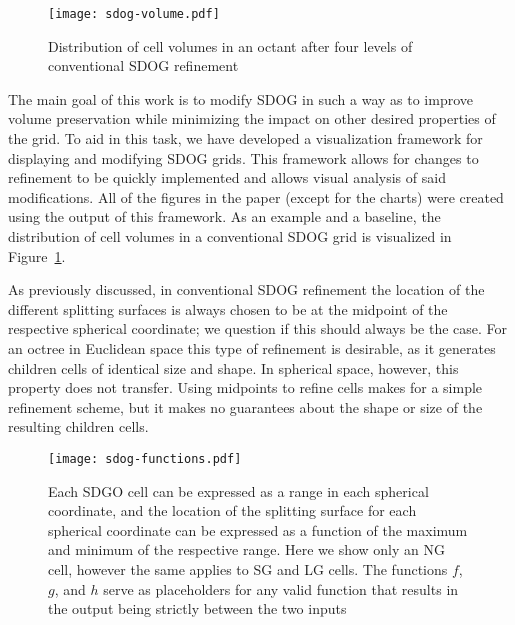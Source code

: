 \begin{figure}[tb]
	\texttt{[image: sdog-volume.pdf]}
	\caption[Title]{
		Distribution of cell volumes in an octant after four levels of conventional SDOG refinement
	}
	\label{fig:sdog-vol}
\end{figure}


The main goal of this work is to modify SDOG in such a way as to improve volume preservation while minimizing the impact on other desired properties of the grid.
To aid in this task, we have developed a visualization framework for displaying and modifying SDOG grids.
This framework allows for changes to refinement to be quickly implemented and allows visual analysis of said modifications.
All of the figures in the paper (except for the charts) were created using the output of this framework.
As an example and a baseline, the distribution of cell volumes in a conventional SDOG grid is visualized in Figure~\ref{fig:sdog-vol}.


As previously discussed, in conventional SDOG refinement the location of the different splitting surfaces is always chosen to be at the midpoint of the respective spherical coordinate; we question if this should always be the case.
For an octree in Euclidean space this type of refinement is desirable, as it generates children cells of identical size and shape.
In spherical space, however, this property does not transfer.
Using midpoints to refine cells makes for a simple refinement scheme, but it makes no guarantees about the shape or size of the resulting children cells.


\begin{figure}[tb]
	\texttt{[image: sdog-functions.pdf]}
	\caption[Title]{
		Each SDGO cell can be expressed as a range in each spherical coordinate, and the location of the splitting surface for each spherical coordinate can be expressed as a function of the maximum and minimum of the respective range.
		Here we show only an NG cell, however the same applies to SG and LG cells.
		The functions $f$, $g$, and $h$ serve as placeholders for any valid function that results in the output being strictly between the two inputs
	}
	\label{fig:functions}
\end{figure}


